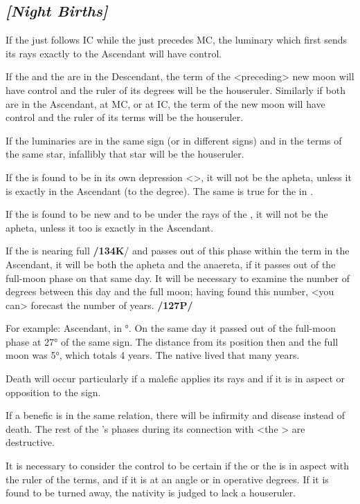 \subsection{\textit{[Night Births]}}

If the \Sun\xspace just follows IC while the \Moon\xspace just
precedes MC, the luminary which first sends its rays exactly to the Ascendant will have control. 

If the \Sun\xspace and the \Moon\xspace are in the Descendant, the term of the <preceding> new moon will have control and the ruler of its degrees will be the houseruler. Similarly if both are in the Ascendant, at MC, or at IC, the term of the new moon will have control and the ruler of its terms will be the houseruler. 

If the luminaries are in the same sign (or in different signs) and in the terms of the same star, infallibly that star will be the houseruler.

If the \Sun\xspace is found to be in its own depression <\Libra>, it will not be the apheta, unless it is exactly in
the Ascendant (to the degree). The same is true for the \Moon\xspace in \Scorpio\xspace <its depression>. 

If the \Moon\xspace is found to be new and to be under the rays of the \Sun, it will not be the apheta, unless it too is exactly in the Ascendant.

If the \Moon\xspace is nearing full \textbf{/134K}/ and passes out of this phase within the term in the Ascendant, it will be both the apheta and the anaereta, if it passes out of the full-moon phase on that same day. It will be necessary to examine the number of degrees between this day and the full moon; having found this number, <you can> forecast the number of years. \textbf{/127P/}

For example: Ascendant, \Moon\xspace in °. On the same
day it passed out of the full-moon phase at 27° of the same sign. The distance from its position then and the full moon was 5°, which totals 4 years. The native lived that many years.

Death will occur particularly if a malefic applies its rays and if it is in aspect or opposition to the sign.

If a benefic is in the same relation, there will be infirmity and disease instead of death. The rest of the \Moon’s phases during its connection with <the \Sun> are destructive.

It is necessary to consider the control to be certain if the \Sun\xspace or the \Moon\xspace is in aspect with the ruler of the terms, and if it is at an angle or in operative degrees. If it is found to be turned away, the nativity is judged to lack a houseruler. 

